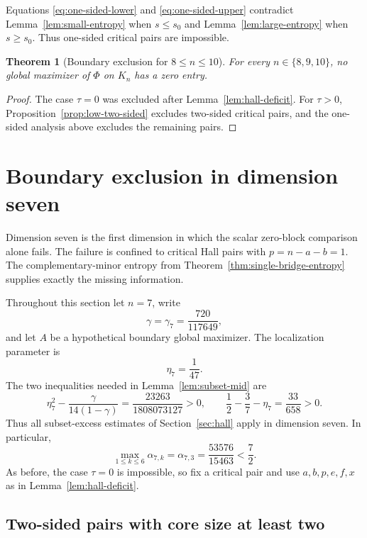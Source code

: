 \documentclass[11pt,a4paper]{article}
\numberwithin{equation}{section}
\newtheorem{theorem}{Theorem}[section]
\theoremstyle{definition}
\newcommand{\1}{\mathbf{1}}
\begin{document}
Equations \eqref{eq:one-sided-lower} and \eqref{eq:one-sided-upper} contradict Lemma~\ref{lem:small-entropy} when $s\le s_0$ and Lemma~\ref{lem:large-entropy} when $s\ge s_0$.  Thus one-sided critical pairs are impossible.

\begin{theorem}[Boundary exclusion for $8\le n\le10$]\label{thm:boundary-low}
For every $n\in\{8,9,10\}$, no global maximizer of $\Phi$ on $K_n$ has a zero entry.
\end{theorem}

\begin{proof}
The case $\tau=0$ was excluded after Lemma~\ref{lem:hall-deficit}.  For $\tau>0$, Proposition~\ref{prop:low-two-sided} excludes two-sided critical pairs, and the one-sided analysis above excludes the remaining pairs.
\end{proof}

\section{Boundary exclusion in dimension seven}\label{sec:n7}

Dimension seven is the first dimension in which the scalar zero-block
comparison alone fails.  The failure is confined to critical Hall pairs with
$p=n-a-b=1$.  The complementary-minor entropy from
Theorem~\ref{thm:single-bridge-entropy} supplies exactly the missing
information.

Throughout this section let $n=7$, write
\[
 \gamma=\gamma_7=\frac{720}{117649},
\]
and let $A$ be a hypothetical boundary global maximizer.  The localization
parameter is
\[
 \eta_7=\frac1{47}.
\]
The two inequalities needed in Lemma~\ref{lem:subset-mid} are
\begin{equation}\label{eq:n7-localization}
 \eta_7^2-\frac{\gamma}{14(1-\gamma)}
 =\frac{23263}{1808073127}>0,
 \qquad
 \frac12-\frac37-\eta_7=\frac{33}{658}>0.
\end{equation}
Thus all subset-excess estimates of Section~\ref{sec:hall} apply in dimension
seven.  In particular,
\begin{equation}\label{eq:n7-alpha-max}
 \max_{1\le k\le6}\alpha_{7,k}
 =\alpha_{7,3}=\frac{53576}{15463}<\frac72.
\end{equation}
As before, the case $\tau=0$ is impossible, so fix a critical pair and use
$a,b,p,e,f,x$ as in Lemma~\ref{lem:hall-deficit}.

\subsection{Two-sided pairs with core size at least two}
\end{document}
